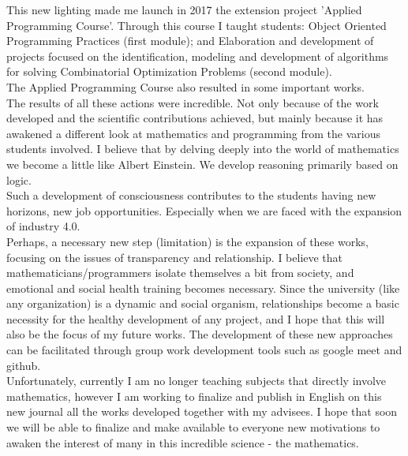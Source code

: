 \documentclass{book}
\begin{document}
This new lighting made me launch in 2017 the extension project 'Applied Programming Course'. Through this course I taught students: Object Oriented Programming Practices (first module); and Elaboration and development of projects focused on the identification, modeling and development of algorithms for solving Combinatorial Optimization Problems (second module). \\

The Applied Programming Course also resulted in some important works.\\

The results of all these actions were incredible. Not only because of the work developed and the scientific contributions achieved, but mainly because it has awakened a different look at mathematics and programming from the various students involved. I believe that by delving deeply into the world of mathematics we become a little like Albert Einstein. We develop reasoning primarily based on logic. \\

Such a development of consciousness contributes to the students having new horizons, new job opportunities. Especially when we are faced with the expansion of industry 4.0. \\

Perhaps, a necessary new step (limitation) is the expansion of these works, focusing on the issues of transparency and relationship. I believe that mathematicians/programmers isolate themselves a bit from society, and emotional and social health training becomes necessary. Since the university (like any organization) is a dynamic and social organism, relationships become a basic necessity for the healthy development of any project, and I hope that this will also be the focus of my future works. The development of these new approaches can be facilitated through group work development tools such as google meet and github. \\

Unfortunately, currently I am no longer teaching subjects that directly involve mathematics, however I am working to finalize and publish in English on this new journal all the works developed together with my advisees. I hope that soon we will be able to finalize and make available to everyone new motivations to awaken the interest of many in this incredible science - the mathematics. 




\end{document}
